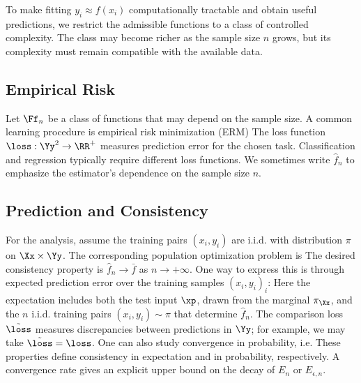 To make fitting $y_i \approx f(x_i)$ computationally tractable and obtain useful predictions, we restrict the admissible functions to a class of controlled complexity. The class may become richer as the sample size $n$ grows, but its complexity must remain compatible with the available data.

\subsection{Empirical Risk}

Let $\Ff_n$ be a class of functions that may depend on the sample size. A common learning procedure is empirical risk minimization (ERM)
The loss function $\loss : \Yy^2 \rightarrow \RR^+$ measures prediction error for the chosen task. %
Classification and regression typically require different loss functions.
%
We sometimes write $\hat f_n$ to emphasize the estimator's dependence on the sample size $n$.


\subsection{Prediction and Consistency}

For the analysis, assume the training pairs $(x_i,y_i)$ are i.i.d. with distribution $\pi$ on $\Xx \times \Yy$. The corresponding population optimization problem is
The desired consistency property is $\hat f_n \rightarrow \bar f$ as $n \rightarrow +\infty$. One way to express this is through expected prediction error over the training samples $(x_i,y_i)_i$:
Here the expectation includes both the test input $\xp$, drawn from the marginal $\pi_\Xx$, and the $n$ i.i.d. training pairs $(x_i,y_i)\sim\pi$ that determine $\hat f_n$.
%
The comparison loss $\tilde\loss$ measures discrepancies between predictions in $\Yy$; for example, we may take $\tilde\loss=\loss$.
One can also study convergence in probability, i.e. 
These properties define consistency in expectation and in probability, respectively.
%
A convergence rate gives an explicit upper bound on the decay of $E_n$ or $E_{\epsilon,n}$.

